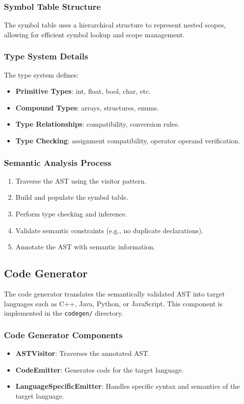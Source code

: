 \documentclass[conference]{IEEEtran}
\begin{document}
\subsubsection{Symbol Table Structure}
The symbol table uses a hierarchical structure to represent nested scopes, allowing for efficient symbol lookup and scope management.

\subsubsection{Type System Details} %
The type system defines:
\begin{itemize}
    \item \textbf{Primitive Types}: int, float, bool, char, etc.
    \item \textbf{Compound Types}: arrays, structures, enums.
    \item \textbf{Type Relationships}: compatibility, conversion rules.
    \item \textbf{Type Checking}: assignment compatibility, operator operand verification.
\end{itemize}

\subsubsection{Semantic Analysis Process}
\begin{enumerate}
    \item Traverse the AST using the visitor pattern.
    \item Build and populate the symbol table.
    \item Perform type checking and inference.
    \item Validate semantic constraints (e.g., no duplicate declarations).
    \item Annotate the AST with semantic information.
\end{enumerate}

\subsection{Code Generator}
The code generator translates the semantically validated AST into target languages such as C++, Java, Python, or JavaScript. This component is implemented in the \texttt{codegen/} directory.

\subsubsection{Code Generator Components}
\begin{itemize}
    \item \textbf{ASTVisitor}: Traverses the annotated AST.
    \item \textbf{CodeEmitter}: Generates code for the target language.
    \item \textbf{LanguageSpecificEmitter}: Handles specific syntax and semantics of the target language.
\end{itemize}
\end{document}
